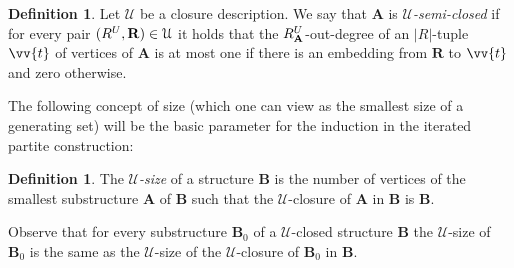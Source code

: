 \documentclass{elsarticle}
\def\str#1{\mathbf {#1}}
\def\nbrel#1#2{R\ifstrempty{#1}{}{_{#1}}\ifstrempty{#2}{}{^{#2}}}
\def\rel#1#2{\nbrel{\ifstrempty{#1}{}{\str{#1}}}{#2}}
\theoremstyle{plain}
\theoremstyle{definition}
\newtheorem{definition}[theorem]{Definition}
\theoremstyle{remark}
\begin{document}
\begin{definition}
Let $\mathcal U$ be a closure description.
We say that $\str{A}$ is \emph{$\mathcal U$-semi-closed} if for every pair
$(\rel{}{U},\str{R})\in \mathcal U$ it holds that the
$\rel{A}{U}$-out-degree of an $\vert R\vert $-tuple $\vv{t}$ of vertices of
$\str{A}$ is at most one if there is an embedding from $\str{R}$ 
to $\vv{t}$ and zero otherwise.
\end{definition}
The following concept of size (which one can view as the smallest size of a generating set) will be the basic parameter for the induction in the iterated partite construction:
\begin{definition}
The \emph{$\mathcal U$-size} of a structure
$\str{B}$ is the number of vertices of the smallest substructure $\str{A}$ of $\str{B}$ such that the $\mathcal U$-closure
of $\str{A}$ in $\str{B}$ is $\str{B}$.
\end{definition}

Observe that for every substructure $\str{B}_0$ of a $\mathcal U$-closed structure $\str{B}$
the $\mathcal U$-size of $\str{B}_0$ is the same as the $\mathcal U$-size of the $\mathcal U$-closure of
$\str{B}_0$ in $\str{B}$.
\end{document}
